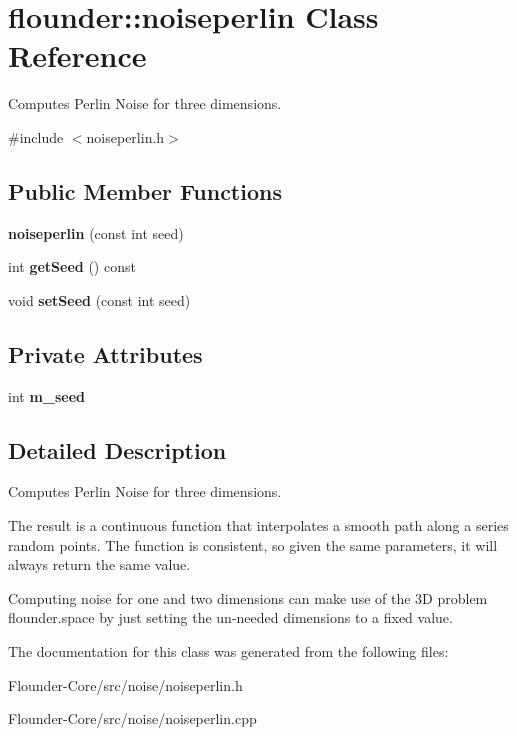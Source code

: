 \hypertarget{classflounder_1_1noiseperlin}{}\section{flounder\+:\+:noiseperlin Class Reference}
\label{classflounder_1_1noiseperlin}


Computes Perlin Noise for three dimensions.  




{\ttfamily \#include $<$noiseperlin.\+h$>$}

\subsection*{Public Member Functions}
\begin{DoxyCompactItemize}
\item 
\mbox{\label{classflounder_1_1noiseperlin_aa3f23285b751f7a2cd19251b5bbbc15a}} 
{\bfseries noiseperlin} (const int seed)
\item 
\mbox{\label{classflounder_1_1noiseperlin_a77abd732a9eecfc641db368b2ebe9a86}} 
int {\bfseries get\+Seed} () const
\item 
\mbox{\label{classflounder_1_1noiseperlin_afe7b799972087108b8fcbcb401e7ecab}} 
void {\bfseries set\+Seed} (const int seed)
\end{DoxyCompactItemize}
\subsection*{Private Attributes}
\begin{DoxyCompactItemize}
\item 
\mbox{\label{classflounder_1_1noiseperlin_ab1bc948f429338f3126592040f8831e7}} 
int {\bfseries m\+\_\+seed}
\end{DoxyCompactItemize}


\subsection{Detailed Description}
Computes Perlin Noise for three dimensions. 

The result is a continuous function that interpolates a smooth path along a series random points. The function is consistent, so given the same parameters, it will always return the same value. 

Computing noise for one and two dimensions can make use of the 3D problem flounder.\+space by just setting the un-\/needed dimensions to a fixed value. 

The documentation for this class was generated from the following files\+:\begin{DoxyCompactItemize}
\item 
Flounder-\/\+Core/src/noise/noiseperlin.\+h\item 
Flounder-\/\+Core/src/noise/noiseperlin.\+cpp\end{DoxyCompactItemize}

